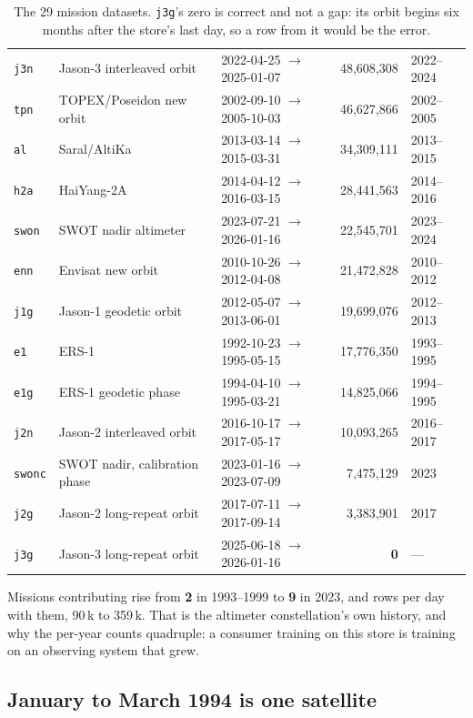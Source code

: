 \documentclass[10pt]{article}
\newcommand{\code}[1]{\texttt{#1}}
\begin{document}
\begin{table}[h]
\begin{tabular}{@{}lllrl@{}}
\code{j3n}    & Jason-3 interleaved orbit     & 2022-04-25 $\to$ 2025-01-07 & 48,608,308  & 2022--2024 \\
\code{tpn}    & TOPEX/Poseidon new orbit      & 2002-09-10 $\to$ 2005-10-03 & 46,627,866  & 2002--2005 \\
\code{al}     & Saral/AltiKa                  & 2013-03-14 $\to$ 2015-03-31 & 34,309,111  & 2013--2015 \\
\code{h2a}    & HaiYang-2A                    & 2014-04-12 $\to$ 2016-03-15 & 28,441,563  & 2014--2016 \\
\code{swon}   & SWOT nadir altimeter          & 2023-07-21 $\to$ 2026-01-16 & 22,545,701  & 2023--2024 \\
\code{enn}    & Envisat new orbit             & 2010-10-26 $\to$ 2012-04-08 & 21,472,828  & 2010--2012 \\
\code{j1g}    & Jason-1 geodetic orbit        & 2012-05-07 $\to$ 2013-06-01 & 19,699,076  & 2012--2013 \\
\code{e1}     & ERS-1                         & 1992-10-23 $\to$ 1995-05-15 & 17,776,350  & 1993--1995 \\
\code{e1g}    & ERS-1 geodetic phase          & 1994-04-10 $\to$ 1995-03-21 & 14,825,066  & 1994--1995 \\
\code{j2n}    & Jason-2 interleaved orbit     & 2016-10-17 $\to$ 2017-05-17 & 10,093,265  & 2016--2017 \\
\code{swonc}  & SWOT nadir, calibration phase & 2023-01-16 $\to$ 2023-07-09 & 7,475,129   & 2023 \\
\code{j2g}    & Jason-2 long-repeat orbit     & 2017-07-11 $\to$ 2017-09-14 & 3,383,901   & 2017 \\
\code{j3g}    & Jason-3 long-repeat orbit     & 2025-06-18 $\to$ 2026-01-16 & \textbf{0}  & --- \\
\bottomrule
\end{tabular}
\caption{The 29 mission datasets. \code{j3g}'s zero is correct and not a gap:
its orbit begins six months after the store's last day, so a row from it would
be the error.}
\end{table}

Missions contributing rise from \textbf{2} in 1993--1999 to \textbf{9} in
2023, and rows per day with them, 90\,k to 359\,k. That is the altimeter
constellation's own history, and why the per-year counts quadruple: a consumer
training on this store is training on an observing system that grew.

\subsection{January to March 1994 is one satellite}
\end{document}
